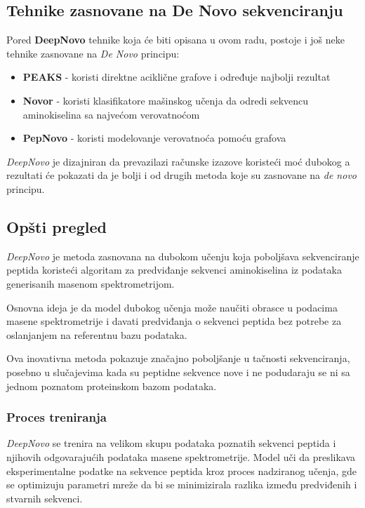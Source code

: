 \documentclass[12pt,oneside]{memoir}
\begin{document}
\subsection{Tehnike zasnovane na De Novo sekvenciranju}
Pored \textbf{DeepNovo} tehnike koja će biti opisana u ovom radu, postoje i još neke tehnike zasnovane na \emph{De Novo} principu:

\begin{itemize}
\item \textbf{PEAKS} \cite{peaks} - koristi direktne aciklične grafove i određuje najbolji rezultat
\item \textbf{Novor} \cite{novor} - koristi klasifikatore mašinskog učenja da odredi sekvencu aminokiselina sa najvećom verovatnoćom
\item \textbf{PepNovo} \cite{pepnovo} - koristi modelovanje verovatnoća pomoću grafova
\end{itemize}

\emph{DeepNovo} je dizajniran da prevazilazi računske izazove koristeći moć dubokog a rezultati će pokazati da je bolji i od drugih metoda koje su zasnovane na \emph{de novo} principu.

\subsection{Opšti pregled}
\emph{DeepNovo} \cite{deepnovo} je metoda zasnovana na dubokom učenju koja poboljšava sekvenciranje peptida koristeći algoritam za predviđanje sekvenci aminokiselina iz podataka generisanih masenom spektrometrijom.

Osnovna ideja je da model dubokog učenja može naučiti obrasce u podacima masene spektrometrije i davati predviđanja o sekvenci peptida bez potrebe za oslanjanjem na referentnu bazu podataka.

Ova inovativna metoda pokazuje značajno poboljšanje u tačnosti sekvenciranja, posebno u slučajevima kada su peptidne sekvence nove i ne podudaraju se ni sa jednom poznatom proteinskom bazom podataka.

\subsubsection{Proces treniranja}
\emph{DeepNovo} se trenira na velikom skupu podataka poznatih sekvenci peptida i njihovih odgovarajućih podataka masene spektrometrije. Model uči da preslikava eksperimentalne podatke na sekvence peptida kroz proces nadziranog učenja, gde se optimizuju parametri mreže da bi se minimizirala razlika između predviđenih i stvarnih sekvenci.
\end{document}
